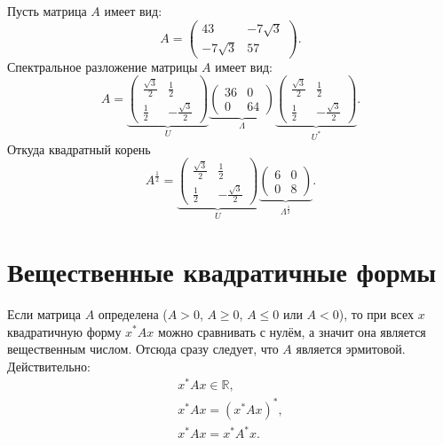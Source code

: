 \begin{example}
    Пусть матрица $A$ имеет вид:
    \[
        A
        = \begin{pmatrix}
              43          & -7 \sqrt{3} \\
              -7 \sqrt{3} & 57
        \end{pmatrix} .
    \]
    Спектральное разложение матрицы $A$ имеет вид:
    \[
        A
        =
        \underbrace{
            \begin{pmatrix}
                \frac{\sqrt{3}}{2} & \frac{1}{2}         \\
                \frac{1}{2}        & -\frac{\sqrt{3}}{2}
            \end{pmatrix}
        }_{U}
        \underbrace{
            \begin{pmatrix}
                36 & 0  \\
                0  & 64
            \end{pmatrix}
        }_{\Lambda}
        \underbrace{
            \begin{pmatrix}
                \frac{\sqrt{3}}{2} & \frac{1}{2}         \\
                \frac{1}{2}        & -\frac{\sqrt{3}}{2}
            \end{pmatrix}
        }_{U^*} .
    \]
    Откуда квадратный корень
    \[
        A^\frac{1}{2}
        =
        \underbrace{
            \begin{pmatrix}
                \frac{\sqrt{3}}{2} & \frac{1}{2}         \\
                \frac{1}{2}        & -\frac{\sqrt{3}}{2}
            \end{pmatrix}
        }_{U}
        \underbrace{
            \begin{pmatrix}
                6 & 0 \\
                0 & 8
            \end{pmatrix}
        }_{\Lambda^\frac{1}{2}} .
    \]
\end{example}


\section{Вещественные квадратичные формы}

Если матрица $A$ определена ($A > 0$, $A \ge 0$, $A \le 0$ или $A < 0$), то при всех $x$ квадратичную форму $x^* A x$ можно сравнивать с нулём, а значит она является
вещественным числом. Отсюда сразу следует, что $A$ является эрмитовой. Действительно:
\begin{gather*}
    x^* A x \in \mathbb{R} , \\
    x^* A x = ( x^* A x )^* , \\
    x^* A x = x^* A^* x .
\end{gather*}

